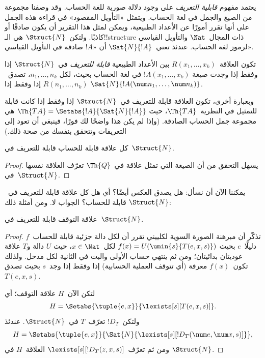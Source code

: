 \documentclass[../../../include/open-logic-section]{subfiles}
\begin{document}


يعتمد مفهوم \emph{قابلية التعريف} على وجود دلالة صورية للغة الحساب.
وقد وصفنا مجموعة من الصيغ والجمل في لغة الحساب. ويتمثل «التأويل
المقصود» في قراءة هذه الجمل على أنها تقرر أمورًا عن الأعداد الطبيعية،
ويمكن لمثل هذا التقرير أن يكون صادقًا أو كاذبًا. ولتكن~$\Struct{N}$
هي الـ!!{structure} ذات المجال~$\Nat$ والتأويل القياسي لرموز لغة
الحساب. عندئذ تعني~$\Sat{N}{!A}$ أن «$!A$ صادقة في التأويل القياسي».

\begin{defn}
تكون العلاقة~$R(x_1,\dots,x_k)$ بين الأعداد الطبيعية
\emph{قابلة للتعريف} في~$\Struct{N}$ إذا وفقط إذا وجدت صيغة
$!A(x_1,\dots,x_k)$ في لغة الحساب بحيث، لكل
$n_1,\dots,n_k$، تصدق~$R(n_1,\dots,n_k)$ إذا وفقط إذا
$\Sat{N}{!A(\num n_1,\dots,\num n_k)}$.
\end{defn}

وبعبارة أخرى، تكون العلاقة قابلة للتعريف في~$\Struct{N}$ إذا وفقط
إذا كانت قابلة للتمثيل في النظرية~$\Th{TA}$، حيث
$\Th{TA} = \Setabs{!A}{\Sat{N}{!A}}$ هي مجموعة جمل الحساب الصادقة.
(وإذا لم يكن هذا واضحًا لك فورًا، فينبغي أن تعود إلى التعريفات وتتحقق
بنفسك من صحة ذلك.)

\begin{lem}
كل علاقة قابلة للحساب قابلة للتعريف في~$\Struct{N}$.
\end{lem}

\begin{proof}
يسهل التحقق من أن الصيغة التي تمثل علاقة في~$\Th{Q}$ تعرّف العلاقة
نفسها في~$\Struct{N}$.
\end{proof}

يمكننا الآن أن نسأل: هل يصدق العكس أيضًا؟ أي هل كل علاقة قابلة
للتعريف في~$\Struct{N}$ قابلة للحساب؟ الجواب لا. ومن أمثلة ذلك:

\begin{lem}
علاقة التوقف قابلة للتعريف في~$\Struct{N}$.
\end{lem}

\begin{proof}
تذكّر أن مبرهنة الصورة السوية لكلييني تقرر أن لكل دالة جزئية قابلة
للحساب~$f$ دليلًا~$e$ بحيث
$f(x) = U(\umin{s}{T(e,x,s)})$ لكل~$x \in \Nat$، حيث
$U$ دالة و$T$ علاقة عوديتان بدائيتان؛ ومن ثم ينتهي حساب الأولى
والبت في الثانية لكل مدخل. ولذلك تكون~$f(x)$ معرفة
(أي تتوقف العملية الحسابية) إذا وفقط إذا وجد~$s$ بحيث تصدق
$T(e,x,s)$.

لتكن الآن~$H$ علاقة التوقف؛ أي
\[
H = \Setabs{\tuple{e,x}}{\lexists[s][T(e, x, s)]}.
\]
ولتكن~$!D_T$ تعرّف~$T$ في~$\Struct{N}$. عندئذ
\[
H = \Setabs{\tuple{e,x}}{\Sat{N}{\lexists[s][!D_T(\num e, \num x, s)]}},
\]
ومن ثم تعرّف~$\lexists[s][!D_T(z, x, s)]$ العلاقة~$H$ في
$\Struct{N}$.
\end{proof}
\end{document}

